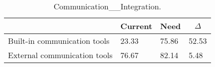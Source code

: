 
  \begin{table*}[]
  \centering
  \notsotiny
  \caption{ Communication__Integration.}
\label{tab:communication__integration}
\begin{tabular}{|l|l|l|l|}
  \hline
  \rowcolor[HTML]{C0C0C0}
    \multicolumn{1}{|c|}{Feature} & \multicolumn{1}{c|}{Current} & \multicolumn{1}{c|}{Need} & \multicolumn{1}{c|}{$\Delta$} \\ \hline
  Built-in communication tools & 23.33 & 75.86 & 52.53 \\ \hline 
External communication tools & 76.67 & 82.14 & 5.48 \\ \hline 
\end{tabular}%
  \end{table*}